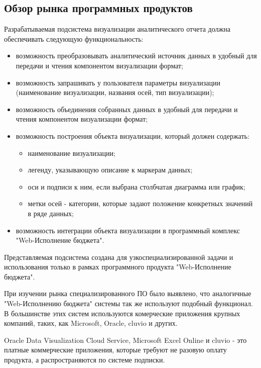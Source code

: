 \documentclass[a4paper]{extarticle}
\numberwithin{equation}{section}
\begin{document}
\subsection{Обзор рынка программных продуктов}
Разрабатываемая подсистема визуализации аналитического отчета должна обеспечивать следующую функциональность:\par
\begin{itemize}
  \item возможность преобразовывать аналитический источник данных в удобный для передачи и чтения компонентом визуализации формат;
  \item возможность запрашивать у пользователя параметры визуализации (наименование визуализации, названия осей, тип визуализации);
  \item возможность объединения собранных данных в удобный для передачи и чтения компонентом визуализации формат;
  \item возможность построения объекта визуализации, который должен содержать:
    \begin{itemize}
    	\item наименование визуализации;
        \item легенду, указывающую описание к маркерам данных;
    	\item оси и подписи к ним, если выбрана столбчатая диаграмма или график;
        \item метки осей - категории, которые задают положение конкретных значений в ряде данных;
    \end{itemize}
  \item возможность интеграции объекта визуализации в программный комплекс "Web-Исполнение бюджета".
\end{itemize}\par
Представляемая подсистема создана для узкоспециализированной задачи и использования только в рамках программного продукта "Web-Исполнение бюджета".\par
При изучении рынка специализированного ПО было выявлено, что аналогичные "Web-Исполнению бюджета" системы так же используют подобный функционал. В большинстве этих систем используются комерческие приложения крупных компаний, таких, как Microsoft, Oracle, cluvio и других.\par
Oracle Data Visualization Cloud Service, Microsoft Excel Online и cluvio - это платные коммерческие приложения, которые требуют не разовую оплату продукта, а распространяются по системе подписки.
\end{document}
